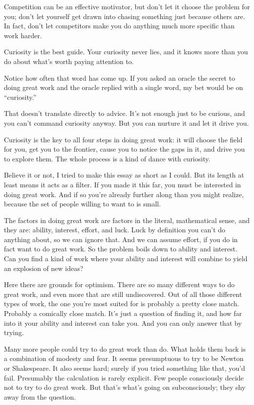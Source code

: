 \documentclass[12pt]{book}
\begin{document}
Competition can be an effective motivator, but don't let it choose the
problem for you; don't let yourself get drawn into chasing something
just because others are. In fact, don't let competitors make you do
anything much more specific than work harder.

Curiosity is the best guide. Your curiosity never lies, and it knows
more than you do about what's worth paying attention to.

Notice how often that word has come up. If you asked an oracle the
secret to doing great work and the oracle replied with a single word, my
bet would be on ``curiosity.''

That doesn't translate directly to advice. It's not enough just to be
curious, and you can't command curiosity anyway. But you can nurture it
and let it drive you.

Curiosity is the key to all four steps in doing great work: it will
choose the field for you, get you to the frontier, cause you to notice
the gaps in it, and drive you to explore them. The whole process is a
kind of dance with curiosity.

Believe it or not, I tried to make this essay as short as I could. But
its length at least means it acts as a filter. If you made it this far,
you must be interested in doing great work. And if so you're already
further along than you might realize, because the set of people willing
to want to is small.

The factors in doing great work are factors in the literal, mathematical
sense, and they are: ability, interest, effort, and luck. Luck by
definition you can't do anything about, so we can ignore that. And we
can assume effort, if you do in fact want to do great work. So the
problem boils down to ability and interest. Can you find a kind of work
where your ability and interest will combine to yield an explosion of
new ideas?

Here there are grounds for optimism. There are so many different ways to
do great work, and even more that are still undiscovered. Out of all
those different types of work, the one you're most suited for is
probably a pretty close match. Probably a comically close match. It's
just a question of finding it, and how far into it your ability and
interest can take you. And you can only answer that by trying.

Many more people could try to do great work than do. What holds them
back is a combination of modesty and fear. It seems presumptuous to try
to be Newton or Shakespeare. It also seems hard; surely if you tried
something like that, you'd fail. Presumably the calculation is rarely
explicit. Few people consciously decide not to try to do great work. But
that's what's going on subconsciously; they shy away from the question.
\end{document}
